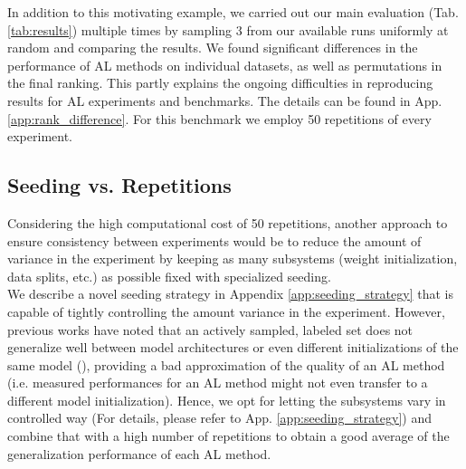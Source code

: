\documentclass[]{article}
\begin{document}
In addition to this motivating example, we carried out our main evaluation (Tab. \ref{tab:results}) multiple times by sampling 3 from our available runs uniformly at random and comparing the results.
We found significant differences in the performance of AL methods on individual datasets, as well as permutations in the final ranking.
This partly explains the ongoing difficulties in reproducing results for AL experiments and benchmarks.
The details can be found in App. \ref{app:rank_difference}.
For this benchmark we employ 50 repetitions of every experiment.


\subsection{Seeding vs. Repetitions}\label{sec:reproducibility}
Considering the high computational cost of 50 repetitions, another approach to ensure consistency between experiments would be to reduce the amount of variance in the experiment by keeping as many subsystems (weight initialization, data splits, etc.) as possible fixed with specialized seeding. \\
We describe a novel seeding strategy in Appendix \ref{app:seeding_strategy} that is capable of tightly controlling the amount variance in the experiment.
However, previous works have noted that an actively sampled, labeled set does not generalize well between model architectures or even different initializations of the same model (\cite{zhou2021towards, lowell2018practical}), providing a bad approximation of the quality of an AL method (i.e. measured performances for an AL method might not even transfer to a different model initialization).
Hence, we opt for letting the subsystems vary in controlled way (For details, please refer to App. \ref{app:seeding_strategy}) and combine that with a high number of repetitions to obtain a good average of the generalization performance of each AL method. 


\end{document}
